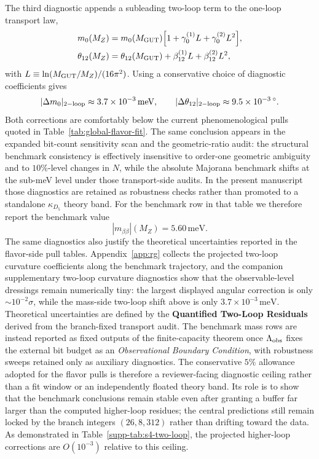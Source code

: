\documentclass[11pt]{article}
\begin{document}
The third diagnostic appends a subleading two-loop term to the one-loop transport law,
\begin{align}
 m_0(M_Z)
 &= m_0(M_{\rm GUT})\Bigl[1+\gamma_0^{(1)}L+\gamma_0^{(2)}L^2\Bigr], \\
 \theta_{12}(M_Z)
 &= \theta_{12}(M_{\rm GUT})+\beta_{12}^{(1)}L+\beta_{12}^{(2)}L^2,
\end{align}
with $L\equiv\ln(M_{\rm GUT}/M_Z)/(16\pi^2)$. Using a conservative choice of diagnostic coefficients gives
\begin{equation}
 |\Delta m_0|_{\rm 2-loop}\approx 3.7\times10^{-3}\,\mathrm{meV},
 \qquad
 |\Delta\theta_{12}|_{\rm 2-loop}\approx 9.5\times10^{-3}\,{}^{\circ}.
\end{equation}
Both corrections are comfortably below the current phenomenological pulls quoted in Table~\ref{tab:global-flavor-fit}. The same conclusion appears in the expanded bit-count sensitivity scan and the geometric-ratio audit: the structural benchmark consistency is effectively insensitive to order-one geometric ambiguity and to $10\%$-level changes in $N$, while the absolute Majorana benchmark shifts at the sub-meV level under those transport-side audits. In the present manuscript those diagnostics are retained as robustness checks rather than promoted to a standalone $\kappa_{D_5}$ theory band. For the benchmark row in that table we therefore report the benchmark value
\begin{equation}
|m_{\beta\beta}|(M_Z)=5.60\,\mathrm{meV}.
\end{equation}
The same diagnostics also justify the theoretical uncertainties reported in the flavor-side pull tables. Appendix~\ref{app:rg} collects the projected two-loop curvature coefficients along the benchmark trajectory, and the companion supplementary two-loop curvature diagnostics show that the observable-level dressings remain numerically tiny: the largest displayed angular correction is only $\sim10^{-2}\sigma$, while the mass-side two-loop shift above is only $3.7\times10^{-3}\,\mathrm{meV}$. Theoretical uncertainties are defined by the \textbf{Quantified Two-Loop Residuals} derived from the branch-fixed transport audit. The benchmark mass rows are instead reported as fixed outputs of the finite-capacity theorem once $\Lambda_{\rm obs}$ fixes the external bit budget as an \emph{Observational Boundary Condition}, with robustness sweeps retained only as auxiliary diagnostics. The conservative $5\%$ allowance adopted for the flavor pulls is therefore a reviewer-facing diagnostic ceiling rather than a fit window or an independently floated theory band. Its role is to show that the benchmark conclusions remain stable even after granting a buffer far larger than the computed higher-loop residues; the central predictions still remain locked by the branch integers $(26,8,312)$ rather than drifting toward the data. As demonstrated in Table~\ref{supp-tab:s4-two-loop}, the projected higher-loop corrections are $O(10^{-3})$ relative to this ceiling.
\end{document}
